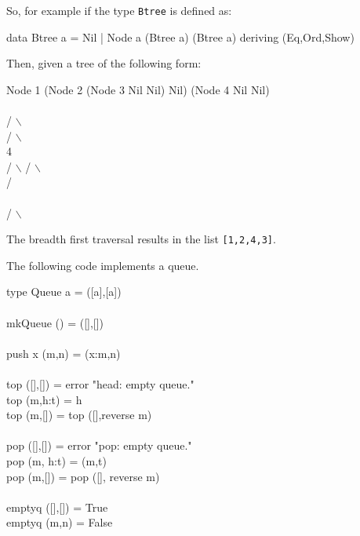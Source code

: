\documentclass[11pt]{article}
\begin{document}
So, for example if the type {\tt{Btree}} is defined as: 
\begin{program*}
\> data Btree a = Nil | Node a (Btree a) (Btree a) deriving (Eq,Ord,Show)
\end{program*}
Then, given a tree of the following form:
\begin{program*}
\>  Node 1 (Node 2 (Node 3 Nil Nil) Nil) (Node 4 Nil Nil)  \\
              \\
\>                   / $\backslash$             \\
\>                  /   $\backslash$            \\
     4           \\
\>                / $\backslash$   / $\backslash$          \\
\>               /                   \\
                    \\
\>             / $\backslash$                    \\
\>
\end{program*}
The breadth first traversal results in the list {\tt{[1,2,4,3]}}.

The following code implements a queue.
\begin{program*}
\>  type Queue a = ([a],[a])          \\
\>            \\
\>  mkQueue () = ([],[])          \\
\>            \\
\>  push x (m,n) = (x:m,n)          \\
\>            \\
\>  top ([],[]) = error "head: empty queue."          \\
\>  top (m,h:t) = h          \\
\>  top (m,[]) = top ([],reverse m)          \\
\>            \\
\>  pop ([],[]) = error "pop: empty queue."          \\
\>  pop (m, h:t) = (m,t)          \\
\>  pop (m,[]) = pop ([], reverse m)          \\
\>            \\
\>  emptyq ([],[]) = True          \\
\>  emptyq (m,n) = False
\end{program*}



\end{document}
